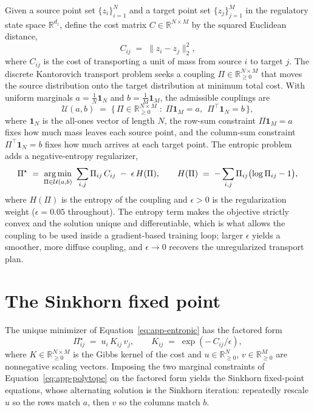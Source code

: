 Given a source point set $\{z_i\}_{i=1}^{N}$ and a target point set $\{z_j\}_{j=1}^{M}$ in the
regulatory state space $\mathbb{R}^{d_z}$, define the cost matrix $C \in \mathbb{R}^{N \times M}$ by the
squared Euclidean distance,
\begin{equation}\label{eq:app-cost}
C_{ij} \;=\; \lVert z_i - z_j \rVert_2^2 ,
\end{equation}
where $C_{ij}$ is the cost of transporting a unit of mass from source $i$ to target $j$. The discrete
Kantorovich transport problem seeks a coupling $\Pi \in \mathbb{R}_{\geq 0}^{N \times M}$ that moves the
source distribution onto the target distribution at minimum total cost. With uniform marginals
$a = \tfrac{1}{N}\mathbf{1}_N$ and $b = \tfrac{1}{M}\mathbf{1}_M$, the admissible couplings are
\begin{equation}\label{eq:app-polytope}
\mathcal{U}(a, b) \;=\; \bigl\{\, \Pi \in \mathbb{R}_{\geq 0}^{N \times M} \;:\;
\Pi \mathbf{1}_M = a,\ \ \Pi^{\top} \mathbf{1}_N = b \,\bigr\},
\end{equation}
where $\mathbf{1}_N$ is the all-ones vector of length $N$, the row-sum constraint $\Pi \mathbf{1}_M = a$
fixes how much mass leaves each source point, and the column-sum constraint $\Pi^{\top}\mathbf{1}_N = b$
fixes how much arrives at each target point. The entropic problem adds a negative-entropy regularizer,
\begin{equation}\label{eq:app-entropic}
\Pi^{\star} \;=\; \operatorname*{arg\,min}_{\Pi \in \mathcal{U}(a,b)}\ \sum_{i,j} \Pi_{ij}\, C_{ij}
\;-\; \epsilon\, H(\Pi),
\qquad
H(\Pi) \;=\; -\sum_{i,j} \Pi_{ij}\bigl(\log \Pi_{ij} - 1\bigr),
\end{equation}
where $H(\Pi)$ is the entropy of the coupling and $\epsilon > 0$ is the regularization weight
($\epsilon = 0.05$ throughout). The entropy term makes the objective strictly convex and the solution
unique and differentiable, which is what allows the coupling to be used inside a gradient-based training
loop; larger $\epsilon$ yields a smoother, more diffuse coupling, and $\epsilon \to 0$ recovers the
unregularized transport plan.

\section{The Sinkhorn fixed point}

The unique minimizer of Equation~\ref{eq:app-entropic} has the factored form
\begin{equation}\label{eq:app-factored}
\Pi^{\star}_{ij} \;=\; u_i\, K_{ij}\, v_j ,
\qquad
K_{ij} \;=\; \exp\!\left(-\,C_{ij} / \epsilon\right),
\end{equation}
where $K \in \mathbb{R}_{\geq 0}^{N \times M}$ is the Gibbs kernel of the cost and $u \in
\mathbb{R}_{\geq 0}^{N}$, $v \in \mathbb{R}_{\geq 0}^{M}$ are nonnegative scaling vectors. Imposing the
two marginal constraints of Equation~\ref{eq:app-polytope} on the factored form yields the Sinkhorn
fixed-point equations, whose alternating solution is the Sinkhorn iteration: repeatedly rescale $u$ so
the rows match $a$, then $v$ so the columns match $b$.

